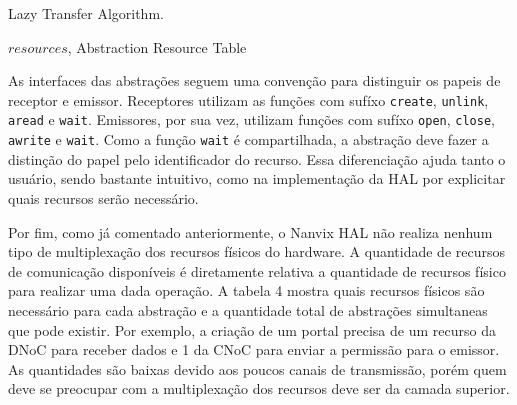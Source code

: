 			\begin{algorithm}
				\caption{Lazy Transfer Algorithm.}
				\label{euclid}
				\begin{algorithmic}[1]
				\Require $resources$, Abstraction Resource Table


					\Else
					\EndIf
				\EndProcedure%


					\Else
					\EndIf
				\EndProcedure%


				\EndProcedure%

				\end{algorithmic}

			\end{algorithm}

			As interfaces das abstrações seguem uma convenção para distinguir os papeis de receptor e emissor.
			Receptores utilizam as funções com sufíxo \texttt{create}, \texttt{unlink}, \texttt{aread} e \texttt{wait}.
			Emissores, por sua vez, utilizam funções com sufíxo \texttt{open}, \texttt{close}, \texttt{awrite} e \texttt{wait}.
			Como a função \texttt{wait} é compartilhada, a abstração deve fazer a distinção do papel pelo identificador do recurso.
			Essa diferenciação ajuda tanto o usuário, sendo bastante intuitivo, como na implementação da HAL por explicitar quais recursos serão necessário.

			Por fim, como já comentado anteriormente, o Nanvix HAL não realiza nenhum tipo de multiplexação dos recursos físicos do hardware.
			A quantidade de recursos de comunicação disponíveis é diretamente relativa a quantidade de recursos físico para realizar uma dada operação.
			A tabela 4 mostra quais recursos físicos são necessário para cada abstração e a quantidade total de abstrações simultaneas que pode existir.
			Por exemplo, a criação de um portal precisa de um recurso da DNoC para receber dados e 1 da CNoC para enviar a permissão para o emissor.
			As quantidades são baixas devido aos poucos canais de transmissão, porém quem deve se preocupar com a multiplexação dos recursos deve ser da camada superior.

